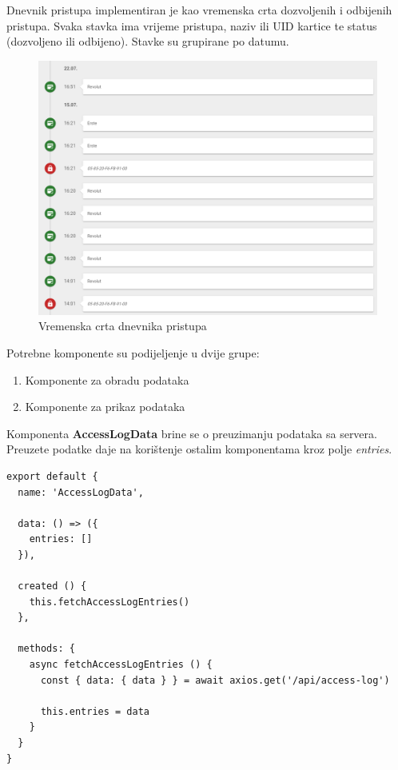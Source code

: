 Dnevnik pristupa implementiran je kao vremenska crta dozvoljenih i odbijenih pristupa.
Svaka stavka ima vrijeme pristupa, naziv ili UID kartice te status (dozvoljeno ili odbijeno).
Stavke su grupirane po datumu.

\pagebreak

\begin{figure}[h!]
    \centering
    \includegraphics[width=\textwidth]{images/access-log}
    \caption{Vremenska crta dnevnika pristupa}
    \label{fig:access-log}
\end{figure}

Potrebne komponente su podijeljenje u dvije grupe:
\begin{enumerate}
    \item Komponente za obradu podataka
    \item Komponente za prikaz podataka
\end{enumerate}

Komponenta \textbf{AccessLogData} brine se o preuzimanju podataka sa servera.
Preuzete podatke daje na korištenje ostalim komponentama kroz polje \textit{entries}.

\begin{lstlisting}
export default {
  name: 'AccessLogData',

  data: () => ({
    entries: []
  }),

  created () {
    this.fetchAccessLogEntries()
  },

  methods: {
    async fetchAccessLogEntries () {
      const { data: { data } } = await axios.get('/api/access-log')

      this.entries = data
    }
  }
}
\end{lstlisting}

